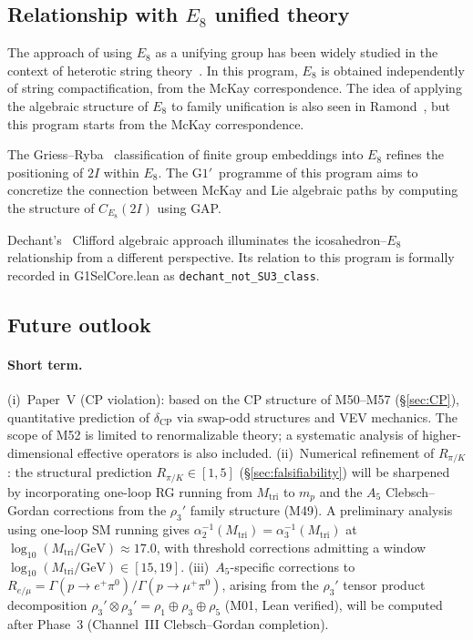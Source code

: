 \documentclass[sn-mathphys-num,Numbered]{sn-jnl}
\theoremstyle{thmstyleone}
\theoremstyle{thmstylethree}
\begin{document}
\subsection{Relationship with $E_8$ unified theory}\label{sec:E8unified}

The approach of using $E_8$ as a unifying group has been widely studied in the
context of heterotic string theory~\cite{GrossHarveyMartinecRohm1985}.  In
this program, $E_8$ is obtained independently of string compactification, from
the McKay correspondence.  The idea of applying the algebraic structure of
$E_8$ to family unification is also seen in Ramond~\cite{Ramond2001}, but this
program starts from the McKay correspondence.

The Griess--Ryba~\cite{GriessRyba1999} classification of finite group
embeddings into $E_8$ refines the positioning of $2I$ within $E_8$.  The
$\mathrm{G1}'$~programme of this program aims to concretize the connection
between McKay and Lie algebraic paths by computing the structure of
$C_{E_8}(2I)$ using GAP.

Dechant's~\cite{Dechant2013} Clifford algebraic approach illuminates the
icosahedron--$E_8$ relationship from a different perspective.  Its relation to
this program is formally recorded in G1SelCore.lean as
\texttt{dechant\_not\_SU3\_class}.


\subsection{Future outlook}\label{sec:outlook}

\paragraph{Short term.}
(i)~Paper~V (CP violation): based on the CP structure of M50--M57 (\S\ref{sec:CP}),
quantitative prediction of $\delta_{\mathrm{CP}}$ via swap-odd structures and
VEV mechanics.  The scope of M52 is limited to renormalizable theory; a
systematic analysis of higher-dimensional effective operators is also included.
(ii)~Numerical refinement of $R_{\pi/K}$: the structural prediction
$R_{\pi/K} \in [1,5]$ (\S\ref{sec:falsifiability}) will be sharpened
by incorporating one-loop RG running from $M_{\mathrm{tri}}$ to $m_p$
and the $A_5$ Clebsch--Gordan corrections from the $\rho_3'$ family
structure (M49).  A preliminary analysis using one-loop SM running
gives $\alpha_2^{-1}(M_{\mathrm{tri}}) = \alpha_3^{-1}(M_{\mathrm{tri}})$
at $\log_{10}(M_{\mathrm{tri}}/\mathrm{GeV}) \approx 17.0$, with
threshold corrections admitting a window
$\log_{10}(M_{\mathrm{tri}}/\mathrm{GeV}) \in [15, 19]$.
(iii)~$A_5$-specific corrections to $R_{e/\mu} = \Gamma(p \to e^+\pi^0)
/ \Gamma(p \to \mu^+\pi^0)$, arising from the $\rho_3'$ tensor product
decomposition $\rho_3' \otimes \rho_3' = \rho_1 \oplus \rho_3 \oplus \rho_5$
(M01, Lean verified), will be computed after Phase~3 (Channel~III
Clebsch--Gordan completion).
\end{document}
